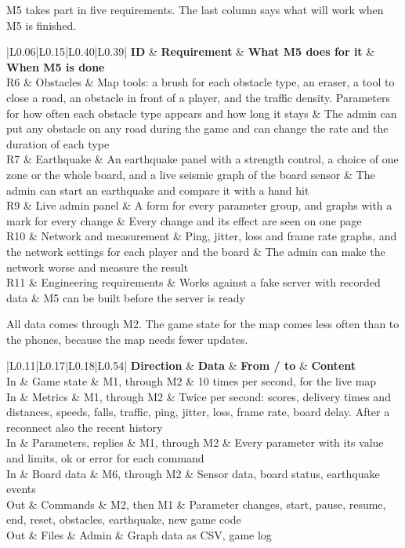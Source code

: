 \documentclass[
  english,
  10pt,
  a4paper,
]{article}
\newcommand{\ckkeep}[1]{\par\noindent\begin{minipage}{\linewidth}\setlength{\parskip}{4pt}#1\end{minipage}\par\smallskip}
\begin{document}
\ckkeep{%
M5 takes part in five requirements. The last column says what will work when M5 is finished.

\begin{tabular}{|L{0.06}|L{0.15}|L{0.40}|L{0.39}|}
\hline \textbf{ID} & \textbf{Requirement} & \textbf{What M5 does for it} & \textbf{When M5 is done} \\ \hline 
R6 & Obstacles & Map tools: a brush for each obstacle type, an eraser, a tool to close a road, an obstacle in front of a player, and the traffic density. Parameters for how often each obstacle type appears and how long it stays & The admin can put any obstacle on any road during the game and can change the rate and the duration of each type \\ \hline
R7 & Earthquake & An earthquake panel with a strength control, a choice of one zone or the whole board, and a live seismic graph of the board sensor & The admin can start an earthquake and compare it with a hand hit \\ \hline
R9 & Live admin panel & A form for every parameter group, and graphs with a mark for every change & Every change and its effect are seen on one page \\ \hline
R10 & Network and measurement & Ping, jitter, loss and frame rate graphs, and the network settings for each player and the board & The admin can make the network worse and measure the result \\ \hline
R11 & Engineering requirements & Works against a fake server with recorded data & M5 can be built before the server is ready \\ \hline
\end{tabular}}


\ckkeep{%
All data comes through M2. The game state for the map comes less often than to the phones, because
the map needs fewer updates.

\begin{tabular}{|L{0.11}|L{0.17}|L{0.18}|L{0.54}|}
\hline \textbf{Direction} & \textbf{Data} & \textbf{From / to} & \textbf{Content} \\ \hline 
In & Game state & M1, through M2 & 10 times per second, for the live map \\ \hline
In & Metrics & M1, through M2 & Twice per second: scores, delivery times and distances, speeds, falls, traffic, ping, jitter, loss, frame rate, board delay. After a reconnect also the recent history \\ \hline
In & Parameters, replies & M1, through M2 & Every parameter with its value and limits, ok or error for each command \\ \hline
In & Board data & M6, through M2 & Sensor data, board status, earthquake events \\ \hline
Out & Commands & M2, then M1 & Parameter changes, start, pause, resume, end, reset, obstacles, earthquake, new game code \\ \hline
Out & Files & Admin & Graph data as CSV, game log \\ \hline
\end{tabular}}
\end{document}
